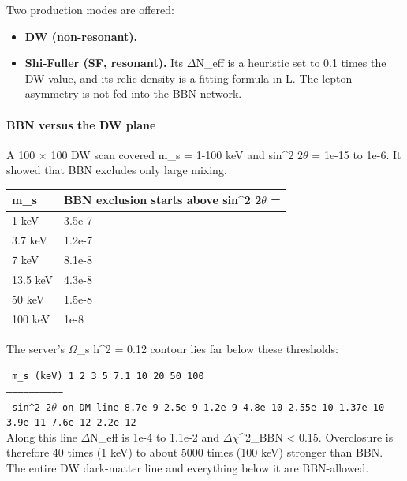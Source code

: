 \documentclass[11pt,a4paper]{article}
\begin{document}
Two production modes are offered:

\begin{itemize}
  \item \textbf{DW (non-resonant).}
  \item \textbf{Shi-Fuller (SF, resonant).} Its $\Delta$N\_eff is a heuristic set to 0.1 times the DW value, and its relic density is a fitting formula in L. The lepton asymmetry is not fed into the BBN network.
\end{itemize}
\paragraph{BBN versus the DW plane}
A 100 $\times$ 100 DW scan covered m\_s = 1-100 keV and sin\textasciicircum{}2 2$\theta$ = 1e-15 to 1e-6. It showed that BBN excludes only large mixing.

\begin{longtable}{@{}p{}p{}@{}}
\toprule
\textbf{m\_s} & \textbf{BBN exclusion starts above sin\textasciicircum{}2 2$\theta$ =} \\ \midrule \endhead
1 keV & 3.5e-7 \\
3.7 keV & 1.2e-7 \\
7 keV & 8.1e-8 \\
13.5 keV & 4.3e-8 \\
50 keV & 1.5e-8 \\
100 keV & 1e-8 \\
\bottomrule\end{longtable}
The server's $\Omega$\_s h\textasciicircum{}2 = 0.12 contour lies far below these thresholds:

\texttt{\textbar{}\allowbreak{} m\_\allowbreak{}s (keV)\allowbreak{} \textbar{}\allowbreak{} 1 \textbar{}\allowbreak{} 2 \textbar{}\allowbreak{} 3 \textbar{}\allowbreak{} 5 \textbar{}\allowbreak{} 7.1 \textbar{}\allowbreak{} 10 \textbar{}\allowbreak{} 20 \textbar{}\allowbreak{} 50 \textbar{}\allowbreak{} 100 \textbar{}\allowbreak{}}\\
\texttt{\textbar{}\allowbreak{}---\textbar{}\allowbreak{}---\textbar{}\allowbreak{}---\textbar{}\allowbreak{}---\textbar{}\allowbreak{}---\textbar{}\allowbreak{}---\textbar{}\allowbreak{}---\textbar{}\allowbreak{}---\textbar{}\allowbreak{}---\textbar{}\allowbreak{}---\textbar{}\allowbreak{}}\\
\texttt{\textbar{}\allowbreak{} sin\textasciicircum{}\allowbreak{}2 2$\theta$ on DM line \textbar{}\allowbreak{} 8.7e-9 \textbar{}\allowbreak{} 2.5e-9 \textbar{}\allowbreak{} 1.2e-9 \textbar{}\allowbreak{} 4.8e-10 \textbar{}\allowbreak{} 2.55e-10 \textbar{}\allowbreak{} 1.37e-10 \textbar{}\allowbreak{} 3.9e-11 \textbar{}\allowbreak{} 7.6e-12 \textbar{}\allowbreak{} 2.2e-12 \textbar{}\allowbreak{}}\\
Along this line $\Delta$N\_eff is 1e-4 to 1.1e-2 and \textbar{}$\Delta$$\chi$\textasciicircum{}2\_BBN\textbar{} \textless{} 0.15. Overclosure is therefore 40 times (1 keV) to about 5000 times (100 keV) stronger than BBN. The entire DW dark-matter line and everything below it are BBN-allowed.
\end{document}
